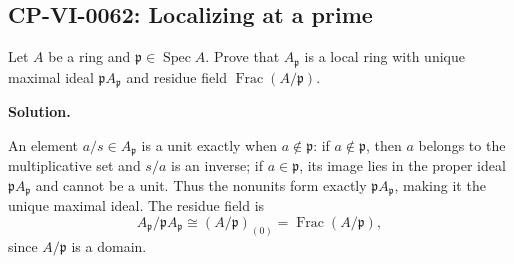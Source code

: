 
\subsection*{CP-VI-0062: Localizing at a prime}

Let $A$ be a ring and $\mathfrak p\in\operatorname{Spec}A$. Prove that $A_{\mathfrak p}$ is a local ring with unique maximal ideal $\mathfrak pA_{\mathfrak p}$ and residue field $\operatorname{Frac}(A/\mathfrak p)$.

\medskip
\noindent\textbf{Solution.}

An element $a/s\in A_{\mathfrak p}$ is a unit exactly when $a\notin\mathfrak p$: if $a\notin\mathfrak p$, then $a$ belongs to the multiplicative set and $s/a$ is an inverse; if $a\in\mathfrak p$, its image lies in the proper ideal $\mathfrak pA_{\mathfrak p}$ and cannot be a unit. Thus the nonunits form exactly $\mathfrak pA_{\mathfrak p}$, making it the unique maximal ideal. The residue field is
\[
A_{\mathfrak p}/\mathfrak pA_{\mathfrak p}\cong (A/\mathfrak p)_{(0)}=\operatorname{Frac}(A/\mathfrak p),
\]
since $A/\mathfrak p$ is a domain.
